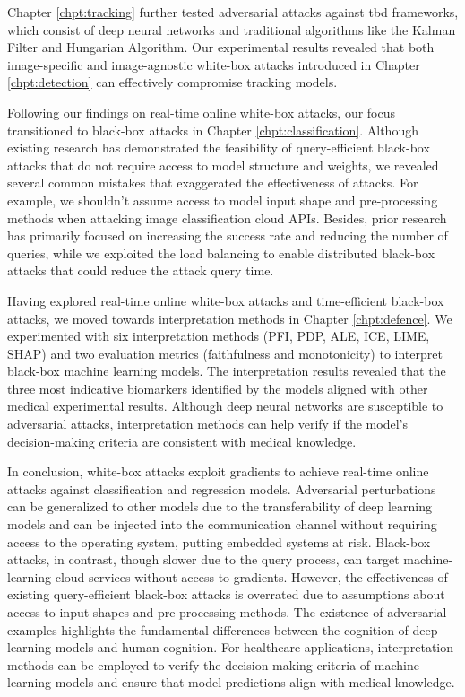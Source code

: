 Chapter \ref{chpt:tracking} further tested adversarial attacks against \acrfull{tbd} frameworks, which consist of deep neural networks and traditional algorithms like the Kalman Filter and Hungarian Algorithm. Our experimental results revealed that both image-specific and image-agnostic white-box attacks introduced in Chapter \ref{chpt:detection} can effectively compromise tracking models.

Following our findings on real-time online white-box attacks, our focus transitioned to black-box attacks in Chapter \ref{chpt:classification}. Although existing research has demonstrated the feasibility of query-efficient black-box attacks that do not require access to model structure and weights, we revealed several common mistakes that exaggerated the effectiveness of attacks. For example, we shouldn't assume access to model input shape and pre-processing methods when attacking image classification cloud APIs. Besides,  prior research has primarily focused on increasing the success rate and reducing the number of queries, while we exploited the load balancing to enable distributed black-box attacks that could reduce the attack query time.

Having explored real-time online white-box attacks and time-efficient black-box attacks, we moved towards interpretation methods in Chapter \ref{chpt:defence}. We experimented with six interpretation methods (PFI, PDP, ALE, ICE, LIME, SHAP) and two evaluation metrics (faithfulness and monotonicity) to interpret black-box machine learning models. The interpretation results revealed that the three most indicative biomarkers identified by the models aligned with other medical experimental results. Although deep neural networks are susceptible to adversarial attacks, interpretation methods can help verify if the model's decision-making criteria are consistent with medical knowledge.

In conclusion, white-box attacks exploit gradients to achieve real-time online attacks against classification and regression models. Adversarial perturbations can be generalized to other models due to the transferability of deep learning models and can be injected into the communication channel without requiring access to the operating system, putting embedded systems at risk. Black-box attacks, in contrast, though slower due to the query process, can target machine-learning cloud services without access to gradients. However, the effectiveness of existing query-efficient black-box attacks is overrated due to assumptions about access to input shapes and pre-processing methods. The existence of adversarial examples highlights the fundamental differences between the cognition of deep learning models and human cognition. For healthcare applications, interpretation methods can be employed to verify the decision-making criteria of machine learning models and ensure that model predictions align with medical knowledge.

